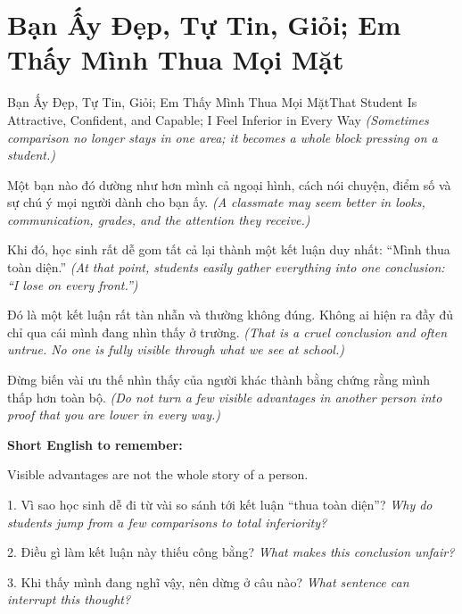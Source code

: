 \section{Bạn Ấy Đẹp, Tự Tin, Giỏi; Em Thấy Mình Thua Mọi Mặt}
\begin{truyen}{Bạn Ấy Đẹp, Tự Tin, Giỏi; Em Thấy Mình Thua Mọi Mặt}{That Student Is Attractive, Confident, and Capable; I Feel Inferior in Every Way}
\textit{(Sometimes comparison no longer stays in one area; it becomes a whole block pressing on a student.)}

Một bạn nào đó dường như hơn mình cả ngoại hình, cách nói chuyện, điểm số và sự chú ý mọi người dành cho bạn ấy.
\textit{(A classmate may seem better in looks, communication, grades, and the attention they receive.)}

Khi đó, học sinh rất dễ gom tất cả lại thành một kết luận duy nhất: “Mình thua toàn diện.”
\textit{(At that point, students easily gather everything into one conclusion: “I lose on every front.”)}

Đó là một kết luận rất tàn nhẫn và thường không đúng. Không ai hiện ra đầy đủ chỉ qua cái mình đang nhìn thấy ở trường.
\textit{(That is a cruel conclusion and often untrue. No one is fully visible through what we see at school.)}
\end{truyen}

\begin{baihoc}
Đừng biến vài ưu thế nhìn thấy của người khác thành bằng chứng rằng mình thấp hơn toàn bộ.
\textit{(Do not turn a few visible advantages in another person into proof that you are lower in every way.)}
\end{baihoc}

\begin{ghinhoanh}
\textbf{Short English to remember:}

Visible advantages are not the whole story of a person.

\end{ghinhoanh}

\begin{tuhocnhanh}
1. Vì sao học sinh dễ đi từ vài so sánh tới kết luận “thua toàn diện”? \textit{Why do students jump from a few comparisons to total inferiority?}

2. Điều gì làm kết luận này thiếu công bằng? \textit{What makes this conclusion unfair?}

3. Khi thấy mình đang nghĩ vậy, nên dừng ở câu nào? \textit{What sentence can interrupt this thought?}
\end{tuhocnhanh}
\ngancach

